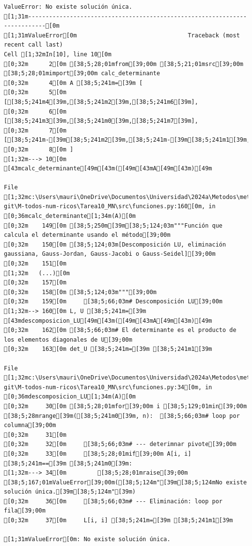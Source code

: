 \documentclass[
  letterpaper,
  DIV=11,
  numbers=noendperiod]{scrartcl}
\begin{document}
\begin{verbatim}
ValueError: No existe solución única.
[1;31m---------------------------------------------------------------------------[0m
[1;31mValueError[0m                                Traceback (most recent call last)
Cell [1;32mIn[10], line 10[0m
[0;32m      2[0m [38;5;28;01mfrom[39;00m [38;5;21;01msrc[39;00m [38;5;28;01mimport[39;00m calc_determinante
[0;32m      4[0m A [38;5;241m=[39m [
[0;32m      5[0m     [[38;5;241m4[39m,[38;5;241m2[39m,[38;5;241m6[39m],
[0;32m      6[0m     [[38;5;241m3[39m,[38;5;241m0[39m,[38;5;241m7[39m],
[0;32m      7[0m     [[38;5;241m-[39m[38;5;241m2[39m,[38;5;241m-[39m[38;5;241m1[39m,[38;5;241m-[39m[38;5;241m3[39m]
[0;32m      8[0m ]
[1;32m---> 10[0m [43mcalc_determinante[49m[43m([49m[43mA[49m[43m)[49m

File [1;32mc:\Users\mauri\OneDrive\Documentos\Universidad\2024a\Metodos\metodos git\M-todos-num-ricos\Tarea10_MN\src\funciones.py:160[0m, in [0;36mcalc_determinante[1;34m(A)[0m
[0;32m    149[0m [38;5;250m[39m[38;5;124;03m"""Función que calcula el determinante usando el método[39;00m
[0;32m    150[0m [38;5;124;03m[Descomposición LU, eliminación gaussiana, Gauss-Jordan, Gauss-Jacobi o Gauss-Seidel][39;00m
[0;32m    151[0m 
[1;32m   (...)[0m
[0;32m    157[0m 
[0;32m    158[0m [38;5;124;03m"""[39;00m
[0;32m    159[0m     [38;5;66;03m# Descomposición LU[39;00m
[1;32m--> 160[0m L, U [38;5;241m=[39m [43mdescomposicion_LU[49m[43m([49m[43mA[49m[43m)[49m
[0;32m    162[0m [38;5;66;03m# El determinante es el producto de los elementos diagonales de U[39;00m
[0;32m    163[0m det_U [38;5;241m=[39m [38;5;241m1[39m

File [1;32mc:\Users\mauri\OneDrive\Documentos\Universidad\2024a\Metodos\metodos git\M-todos-num-ricos\Tarea10_MN\src\funciones.py:34[0m, in [0;36mdescomposicion_LU[1;34m(A)[0m
[0;32m     30[0m [38;5;28;01mfor[39;00m i [38;5;129;01min[39;00m [38;5;28mrange[39m([38;5;241m0[39m, n):  [38;5;66;03m# loop por columna[39;00m
[0;32m     31[0m 
[0;32m     32[0m     [38;5;66;03m# --- deterimnar pivote[39;00m
[0;32m     33[0m     [38;5;28;01mif[39;00m A[i, i] [38;5;241m==[39m [38;5;241m0[39m:
[1;32m---> 34[0m         [38;5;28;01mraise[39;00m [38;5;167;01mValueError[39;00m([38;5;124m"[39m[38;5;124mNo existe solución única.[39m[38;5;124m"[39m)
[0;32m     36[0m     [38;5;66;03m# --- Eliminación: loop por fila[39;00m
[0;32m     37[0m     L[i, i] [38;5;241m=[39m [38;5;241m1[39m

[1;31mValueError[0m: No existe solución única.
\end{verbatim}
\end{document}
